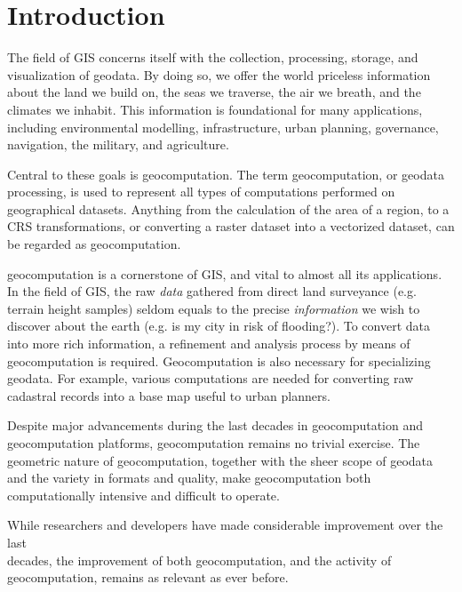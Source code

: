 \chapter{Introduction}
\label{chap:intro}

The field of \ac{GIS} concerns itself with the collection, processing, storage, and visualization of geodata. 
By doing so, we offer the world priceless information about the land we build on, the seas we traverse, the air we breath, and the climates we inhabit. 
This information is foundational for many applications, including environmental modelling, infrastructure, urban planning, governance, navigation, the military, and agriculture.   

Central to these goals is \ac{geocomputation}. 
The term geocomputation, or geodata processing, is used to represent all types of computations performed on geographical datasets. Anything from the calculation of the area of a region, to a \ac{CRS} transformations, or converting a raster dataset into a vectorized dataset, can be regarded as geocomputation.

geocomputation is a cornerstone of \ac{GIS}, and vital to almost all its applications.
In the field of GIS, the raw \emph{data} gathered from direct land surveyance (e.g. terrain height samples) seldom equals to the precise \emph{information} we wish to discover about the earth (e.g. is my city in risk of flooding?).
To convert data into more rich information, a refinement and analysis process by means of geocomputation is required. 
Geocomputation is also necessary for specializing geodata. 
For example, various computations are needed for converting raw cadastral records into a base map useful to urban planners.

Despite major advancements during the last decades in geocomputation and geocomputation platforms, geocomputation remains no trivial exercise. 
The geometric nature of geocomputation, together with the sheer scope of geodata and the variety in formats and quality, make geocomputation both computationally intensive and difficult to operate. 

While researchers and developers have made considerable improvement over the last \\ decades, the improvement of both geocomputation, and the activity of geocomputation, remains as relevant as ever before. 

